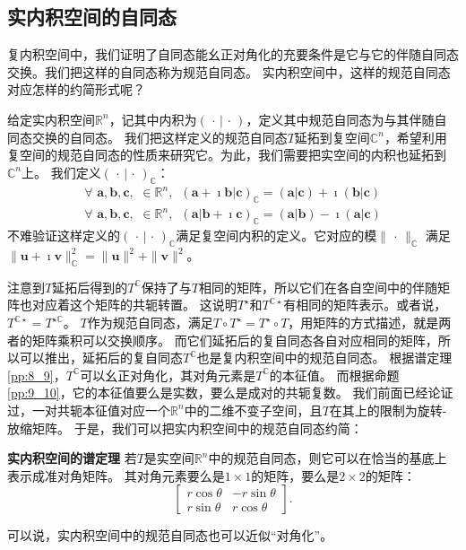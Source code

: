 \documentclass[12pt,UTF8]{ctexbook}
\begin{document}
\subsection{实内积空间的自同态}
复内积空间中，我们证明了自同态能幺正对角化的充要条件是它与它的伴随自同态交换。我们把这样的自同态称为规范自同态。
实内积空间中，这样的规范自同态对应怎样的约简形式呢？

给定实内积空间$\mathbb{R}^n$，记其中内积为$(\,\cdot\,|\,\cdot\,)$，定义其中规范自同态为与其伴随自同态交换的自同态。
我们把这样定义的规范自同态$T$延拓到复空间$\mathbb{C}^n$，希望利用复空间的规范自同态的性质来研究它。为此，我们需要把实空间的内积也延拓到$\mathbb{C}^n$上。
我们定义$(\,\cdot\,|\,\cdot\,)_\mathbb{C}$：
\begin{align*}
    \forall \,\, \mathbf{a}, \mathbf{b}, \mathbf{c}, \,\, \in \mathbb{R}^n , \,\,\, (\mathbf{a} + \imath  \mathbf{b}|\mathbf{c})_\mathbb{C} = (\mathbf{a}|\mathbf{c}) + \imath (\mathbf{b}|\mathbf{c})  \\
    \forall \,\, \mathbf{a}, \mathbf{b}, \mathbf{c}, \,\, \in \mathbb{R}^n , \,\,\, (\mathbf{a}|\mathbf{b} + \imath  \mathbf{c})_\mathbb{C} = (\mathbf{a}|\mathbf{b}) - \imath (\mathbf{a}|\mathbf{c}) 
\end{align*}
不难验证这样定义的$(\,\cdot\,|\,\cdot\,)_\mathbb{C}$满足复空间内积的定义。它对应的模$\| \, \cdot \, \|_\mathbb{C}$
满足$\| \mathbf{u} + \imath  \mathbf{v}\|_\mathbb{C}^2 = \|\mathbf{u}\|^2 + \|\mathbf{v}\|^2$。

注意到$T$延拓后得到的$T^\mathbb{C}$保持了与$T$相同的矩阵，所以它们在各自空间中的伴随矩阵也对应着这个矩阵的共轭转置。
这说明$T^\star$和$T^{\mathbb{C}\star}$有相同的矩阵表示。或者说，$T^{\mathbb{C}\star} = T^{\star\mathbb{C}}$。
$T$作为规范自同态，满足$T\circ T^\star = T^\star \circ T$，用矩阵的方式描述，就是两者的矩阵乘积可以交换顺序。
而它们延拓后的复自同态各自对应相同的矩阵，所以可以推出，延拓后的复自同态$T^\mathbb{C}$也是复内积空间中的规范自同态。
根据谱定理\ref{pp:8_9}，$T^\mathbb{C}$可以幺正对角化，其对角元素是$T^\mathbb{C}$的本征值。
而根据命题\ref{pp:9_10}，它的本征值要么是实数，要么是成对的共轭复数。
我们前面已经论证过，一对共轭本征值对应一个$\mathbb{R}^n$中的二维不变子空间，且$T$在其上的限制为旋转-放缩矩阵。
于是，我们可以把实内积空间中的规范自同态约简：
\begin{pp}\textbf{实内积空间的谱定理 }\label{pp:9_12}
    若$T$是实空间$\mathbb{R}^n$中的规范自同态，则它可以在恰当的基底上表示成准对角矩阵。
    其对角元素要么是$1\times 1$的矩阵，要么是$2\times 2$的矩阵：
    $$ \begin{bmatrix}
        r\cos\theta & -r\sin\theta \\ r\sin\theta & r\cos\theta
    \end{bmatrix}.$$
\end{pp}
可以说，实内积空间中的规范自同态也可以近似“对角化”。
\end{document}
